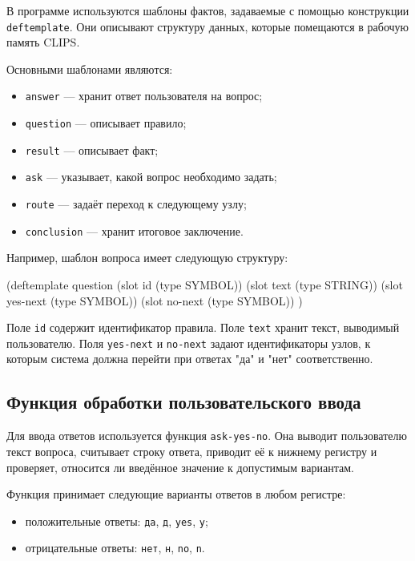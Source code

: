 \documentclass[14pt,a4paper]{extarticle}
\begin{document}
В программе используются шаблоны фактов, задаваемые с помощью конструкции \texttt{deftemplate}. Они описывают структуру данных, которые помещаются в рабочую память CLIPS.

Основными шаблонами являются:

\begin{itemize}
    \item \texttt{answer} --- хранит ответ пользователя на вопрос;
    \item \texttt{question} --- описывает правило;
    \item \texttt{result} --- описывает факт;
    \item \texttt{ask} --- указывает, какой вопрос необходимо задать;
    \item \texttt{route} --- задаёт переход к следующему узлу;
    \item \texttt{conclusion} --- хранит итоговое заключение.
\end{itemize}

Например, шаблон вопроса имеет следующую структуру:

\begin{Code}
(deftemplate question
  (slot id (type SYMBOL))
  (slot text (type STRING))
  (slot yes-next (type SYMBOL))
  (slot no-next (type SYMBOL))
)
\end{Code}

Поле \texttt{id} содержит идентификатор правила. Поле \texttt{text} хранит текст, выводимый пользователю. Поля \texttt{yes-next} и \texttt{no-next} задают идентификаторы узлов, к которым система должна перейти при ответах "да" и "нет" соответственно.

\subsection{Функция обработки пользовательского ввода}

Для ввода ответов используется функция \texttt{ask-yes-no}. Она выводит пользователю текст вопроса, считывает строку ответа, приводит её к нижнему регистру и проверяет, относится ли введённое значение к допустимым вариантам.

Функция принимает следующие варианты ответов в любом регистре:

\begin{itemize}
    \item положительные ответы: \texttt{да}, \texttt{д}, \texttt{yes}, \texttt{y};
    \item отрицательные ответы: \texttt{нет}, \texttt{н}, \texttt{no}, \texttt{n}.
\end{itemize}
\end{document}
